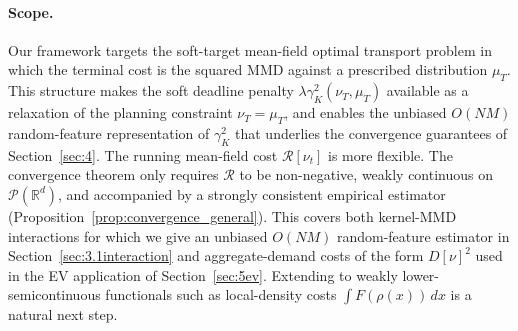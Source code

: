 \documentclass[11pt,leqno]{article}
\theoremstyle{plain}
\theoremstyle{remark}
\theoremstyle{definition}
\numberwithin{equation}{section}
\numberwithin{figure}{section}
\numberwithin{table}{section}
\numberwithin{algorithm}{section}
\newcommand{\RR}{\mathbb{R}}
\newcommand{\cP}{\mathcal{P}}
\begin{document}
\paragraph{Scope.}
Our framework targets the soft-target mean-field optimal transport problem
in which the terminal cost is the squared MMD against a prescribed distribution $\mu_T$.
This structure makes the soft deadline penalty $\lambda\gamma_K^2(\nu_T,\mu_T)$ available
as a relaxation of the planning constraint $\nu_T=\mu_T$,
and enables the unbiased $O(NM)$ random-feature representation of $\gamma_K^2$ that underlies the convergence guarantees of Section~\ref{sec:4}.
The running mean-field cost $\mathcal{R}[\nu_t]$ is more flexible. 
The convergence theorem only requires $\mathcal{R}$ to be non-negative, weakly continuous on $\cP(\RR^d)$,
and accompanied by a strongly consistent empirical estimator (Proposition~\ref{prop:convergence_general}).
This covers both kernel-MMD interactions for which we give an unbiased $O(NM)$ random-feature estimator in Section~\ref{sec:3.1interaction}
and aggregate-demand costs of the form $D[\nu]^2$ used in the EV application of Section~\ref{sec:5ev}. 
Extending to weakly lower-semicontinuous functionals such as local-density costs $\int F(\rho(x))\,dx$
is a natural next step.
\end{document}
